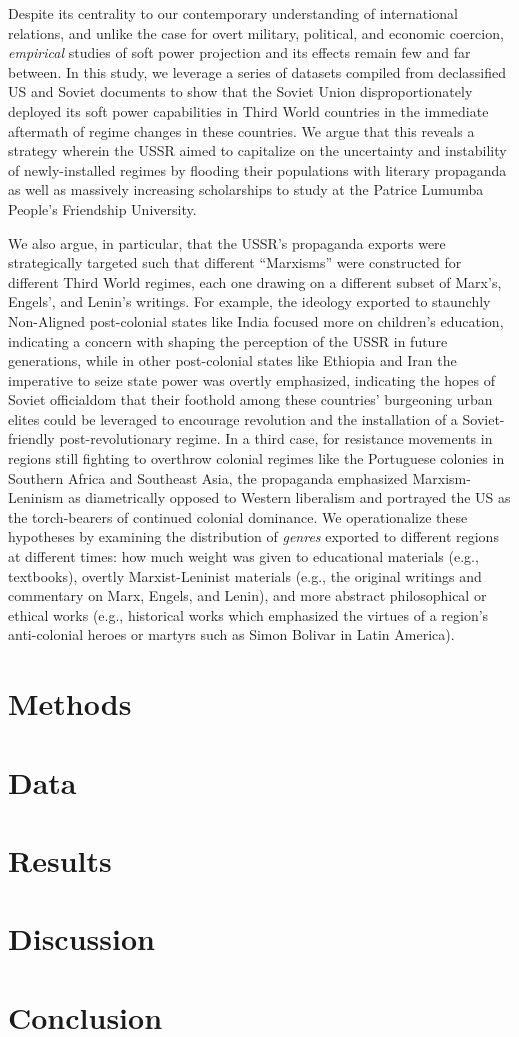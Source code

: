 Despite its centrality to our contemporary understanding of international relations, and unlike the case for overt military, political, and economic coercion, \textit{empirical} studies of soft power projection and its effects remain few and far between. In this study, we leverage a series of datasets compiled from declassified US and Soviet documents to show that the Soviet Union disproportionately deployed its soft power capabilities in Third World countries in the immediate aftermath of regime changes in these countries. We argue that this reveals a strategy wherein the USSR aimed to capitalize on the uncertainty and instability of newly-installed regimes by flooding their populations with literary propaganda as well as massively increasing scholarships to study at the Patrice Lumumba People's Friendship University.

We also argue, in particular, that the USSR's propaganda exports were strategically targeted such that different ``Marxisms'' were constructed for different Third World regimes, each one drawing on a different subset of Marx's, Engels', and Lenin's writings. For example, the ideology exported to staunchly Non-Aligned post-colonial states like India focused more on children's education, indicating a concern with shaping the perception of the USSR in future generations, while in other post-colonial states like Ethiopia and Iran the imperative to seize state power was overtly emphasized, indicating the hopes of Soviet officialdom that their foothold among these countries' burgeoning urban elites could be leveraged to encourage revolution and the installation of a Soviet-friendly post-revolutionary regime. In a third case, for resistance movements in regions still fighting to overthrow colonial regimes like the Portuguese colonies in Southern Africa and Southeast Asia, the propaganda emphasized Marxism-Leninism as diametrically opposed to Western liberalism and portrayed the US as the torch-bearers of continued colonial dominance. We operationalize these hypotheses by examining the distribution of \textit{genres} exported to different regions at different times: how much weight was given to educational materials (e.g., textbooks), overtly Marxist-Leninist materials (e.g., the original writings and commentary on Marx, Engels, and Lenin), and more abstract philosophical or ethical works (e.g., historical works which emphasized the virtues of a region's anti-colonial heroes or martyrs such as Simon Bolivar in Latin America).

\section{Methods}

\section{Data}

\section{Results}

\section{Discussion}

\section{Conclusion}

